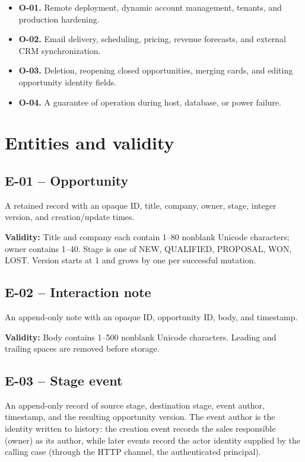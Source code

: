 \documentclass[10pt,a4paper]{article}
\begin{document}
\begin{itemize}

\item \textbf{O-01.} Remote deployment, dynamic account management, tenants, and production hardening.

\item \textbf{O-02.} Email delivery, scheduling, pricing, revenue forecasts, and external CRM synchronization.

\item \textbf{O-03.} Deletion, reopening closed opportunities, merging cards, and editing opportunity identity fields.

\item \textbf{O-04.} A guarantee of operation during host, database, or power failure.

\end{itemize}

\section{Entities and validity}

\subsection{E-01 -- Opportunity}

A retained record with an opaque ID, title, company, owner, stage, integer version, and creation/update times.

\textbf{Validity:} Title and company each contain 1--80 nonblank Unicode characters; owner contains 1--40. Stage is one of NEW, QUALIFIED, PROPOSAL, WON, LOST. Version starts at 1 and grows by one per successful mutation.

\subsection{E-02 -- Interaction note}

An append-only note with an opaque ID, opportunity ID, body, and timestamp.

\textbf{Validity:} Body contains 1--500 nonblank Unicode characters. Leading and trailing spaces are removed before storage.

\subsection{E-03 -- Stage event}

An append-only record of source stage, destination stage, event author, timestamp, and the resulting opportunity version. The event author is the identity written to history: the creation event records the sales responsible (owner) as its author, while later events record the actor identity supplied by the calling case (through the HTTP channel, the authenticated principal).
\end{document}
